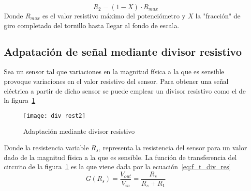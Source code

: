\documentclass [twocolumn, a4paper] {article}
\begin{document}
	\begin{equation} 
		\label{eq:div_res2}
			R_{2}=(1-X) \cdot R_{max}
	\end{equation}
Donde $R_{max}$ es el valor resistivo máximo del potenciómetro y $X$ la "fracción" de giro completado del tornillo hasta llegar al fondo de escala.
\subsection{Adpatación de señal mediante divisor resistivo}
Sea un sensor tal que variaciones en la magnitud física a la que es sensible provoque variaciones en el valor resistivo del sensor. Para obtener una señal eléctrica a partir de dicho sensor se puede emplear un divisor resistivo como el de la figura~\ref{fig:divisor2}
	\begin{figure}
 		 \centering
   			 \texttt{[image: div\_rest2]}
 		 \caption{Adaptación mediante divisor resistivo}
  		\label{fig:divisor2}
	\end{figure}
Donde la resistencia variable $R_{s}$, representa la resistencia del sensor para un valor dado de la magnitud física a la que es sensible. La función de transferencia del circuito de la figura~\ref{fig:divisor2} es la que viene dada por la ecuación~\ref{eq:f_t_div_res}
	\begin{equation}
		\label{eq:f_t_div_res}
			G(R_{s})=\frac{V_{out}}{V_{in}}=\frac{R_{s}}{R_{s}+R_{1}}
	\end{equation}
\end{document}
